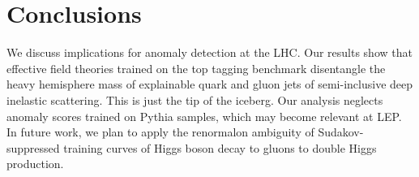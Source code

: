 \section{Conclusions}\label{sec:conclusions}

We discuss implications for anomaly detection at the LHC. Our results
show that effective field theories trained on the top tagging benchmark
disentangle the heavy hemisphere mass of explainable quark and gluon
jets of semi-inclusive deep inelastic scattering. This is just the tip
of the iceberg. Our analysis neglects anomaly scores trained on Pythia
samples, which may become relevant at LEP. In future work, we plan to
apply the renormalon ambiguity of Sudakov-suppressed training curves of
Higgs boson decay to gluons to double Higgs production.

